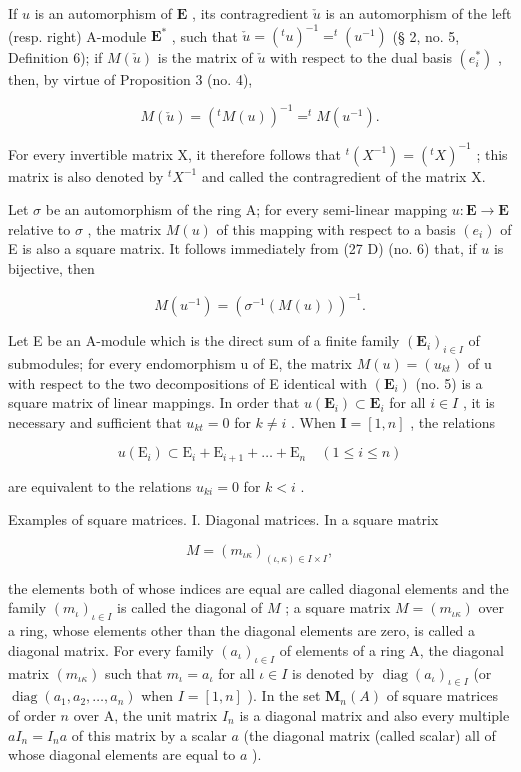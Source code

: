 If \(u\) is an automorphism of \(\mathbf{E}\) , its contragredient \(\check{u}\) is an automorphism of the left (resp. right) A-module \(\mathbf{E}^*\) , such that \(\check{u} = (^{t}u)^{-1} = ^{t}(u^{-1})\) (§ 2, no. 5, Definition 6); if \(M(\check{u})\) is the matrix of \(\check{u}\) with respect to the dual basis \((e_{i}^{*})\) , then, by virtue of Proposition 3 (no. 4),

\[
M (\check {u}) = (^ {t} M (u)) ^ {- 1} = ^ {t} M (u ^ {- 1}).\tag{29}
\]

For every invertible matrix X, it therefore follows that \({}^{t}(X^{-1}) = ({}^{t}X)^{-1}\) ; this matrix is also denoted by \({}^{t}X^{-1}\) and called the contragredient of the matrix X.

Let \(\sigma\) be an automorphism of the ring A; for every semi-linear mapping \(u: \mathbf{E} \to \mathbf{E}\) relative to \(\sigma\) , the matrix \(M(u)\) of this mapping with respect to a basis \((e_i)\) of E is also a square matrix. It follows immediately from (27 D) (no. 6) that, if \(u\) is bijective, then

\[
M (u ^ {- 1}) = (\sigma^ {- 1} (M (u))) ^ {- 1}.
\]

Let E be an A-module which is the direct sum of a finite family \((\mathbf{E}_{i})_{i\in I}\) of submodules; for every endomorphism u of E, the matrix \(M(u)=(u_{kt})\) of u with respect to the two decompositions of E identical with \((\mathbf{E}_{i})\) (no. 5) is a square matrix of linear mappings. In order that \(u(\mathbf{E}_{i})\subset\mathbf{E}_{i}\) for all \(i\in I\) , it is necessary and sufficient that \(u_{kt}=0\) for \(k\neq i\) . When \(\mathbf{I} = [1, n]\) , the relations

\[
u (\mathrm{E} _ {i}) \subset \mathrm{E} _ {i} + \mathrm{E} _ {i + 1} + \dots + \mathrm{E} _ {n} \quad (1 \leqslant i \leqslant n)
\]

are equivalent to the relations \(u_{ki} = 0\) for \(k < i\) .

Examples of square matrices. I. Diagonal matrices. In a square matrix

\[
M = \left(m _ {\iota \kappa}\right) _ {(\iota, \kappa) \in I \times I},
\]

the elements both of whose indices are equal are called diagonal elements and the family \((m_{\iota})_{\iota \in I}\) is called the diagonal of \(M\) ; a square matrix \(M = (m_{\iota \kappa})\) over a ring, whose elements other than the diagonal elements are zero, is called a diagonal matrix. For every family \((a_{\iota})_{\iota \in I}\) of elements of a ring A, the diagonal matrix \((m_{\iota \kappa})\) such that \(m_{\iota} = a_{\iota}\) for all \(\iota \in I\) is denoted by \(\operatorname{diag}(a_{\iota})_{\iota \in I}\) (or \(\operatorname{diag}(a_1, a_2, \ldots, a_n)\) when \(I = [1, n]\) ). In the set \(\mathbf{M}_n(A)\) of square matrices of order \(n\) over A, the unit matrix \(I_n\) is a diagonal matrix and also every multiple \(aI_n = I_na\) of this matrix by a scalar \(a\) (the diagonal matrix (called scalar) all of whose diagonal elements are equal to \(a\) ).

